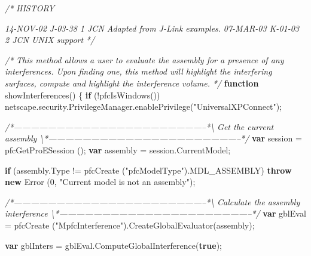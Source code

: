 \documentclass[]{article}
\newenvironment{Shaded}{}{}
\newcommand{\KeywordTok}[1]{\textcolor[rgb]{0.00,0.44,0.13}{\textbf{{#1}}}}
\newcommand{\DecValTok}[1]{\textcolor[rgb]{0.25,0.63,0.44}{{#1}}}
\newcommand{\StringTok}[1]{\textcolor[rgb]{0.25,0.44,0.63}{{#1}}}
\newcommand{\CommentTok}[1]{\textcolor[rgb]{0.38,0.63,0.69}{\textit{{#1}}}}
\newcommand{\OtherTok}[1]{\textcolor[rgb]{0.00,0.44,0.13}{{#1}}}
\newcommand{\FunctionTok}[1]{\textcolor[rgb]{0.02,0.16,0.49}{{#1}}}
\newcommand{\NormalTok}[1]{{#1}}
\begin{document}
\begin{Shaded}
\begin{Highlighting}[]
\CommentTok{/*}
\CommentTok{   HISTORY}

\CommentTok{14-NOV-02   J-03-38   $$1   JCN      Adapted from J-Link examples.}
\CommentTok{07-MAR-03   K-01-03   $$2   JCN      UNIX support}
\CommentTok{*/}

\CommentTok{/*}
\CommentTok{   This method allows a user to evaluate the assembly for a presence of any}
\CommentTok{   interferences. Upon finding one, this method will highlight the interfering}
\CommentTok{   surfaces, compute and highlight the interference volume.}
\CommentTok{*/}
\KeywordTok{function} \FunctionTok{showInterferences}\NormalTok{()}
\NormalTok{\{}
  \KeywordTok{if} \NormalTok{(!}\FunctionTok{pfcIsWindows}\NormalTok{())}
    \OtherTok{netscape}\NormalTok{.}\OtherTok{security}\NormalTok{.}\OtherTok{PrivilegeManager}\NormalTok{.}\FunctionTok{enablePrivilege}\NormalTok{(}\StringTok{"UniversalXPConnect"}\NormalTok{);}

\CommentTok{/*--------------------------------------------------------------------*\textbackslash{} }
\CommentTok{  Get the current assembly }
\CommentTok{\textbackslash{}*--------------------------------------------------------------------*/}  
  \KeywordTok{var} \NormalTok{session = }\FunctionTok{pfcGetProESession} \NormalTok{();}
  \KeywordTok{var} \NormalTok{assembly = }\OtherTok{session}\NormalTok{.}\FunctionTok{CurrentModel}\NormalTok{;}
  
  \KeywordTok{if} \NormalTok{(}\OtherTok{assembly}\NormalTok{.}\FunctionTok{Type} \NormalTok{!= }\FunctionTok{pfcCreate} \NormalTok{(}\StringTok{"pfcModelType"}\NormalTok{).}\FunctionTok{MDL_ASSEMBLY}\NormalTok{)}
    \KeywordTok{throw} \KeywordTok{new} \FunctionTok{Error} \NormalTok{(}\DecValTok{0}\NormalTok{, }\StringTok{"Current model is not an assembly"}\NormalTok{);}
  
\CommentTok{/*--------------------------------------------------------------------*\textbackslash{} }
\CommentTok{  Calculate the assembly interference}
\CommentTok{\textbackslash{}*--------------------------------------------------------------------*/}
  \KeywordTok{var} \NormalTok{gblEval = }
    \FunctionTok{pfcCreate} \NormalTok{(}\StringTok{"MpfcInterference"}\NormalTok{).}\FunctionTok{CreateGlobalEvaluator}\NormalTok{(assembly);}
  
  \KeywordTok{var} \NormalTok{gblInters = }\OtherTok{gblEval}\NormalTok{.}\FunctionTok{ComputeGlobalInterference}\NormalTok{(}\KeywordTok{true}\NormalTok{);}
  

\end{Highlighting}
\end{Shaded}
\end{document}
